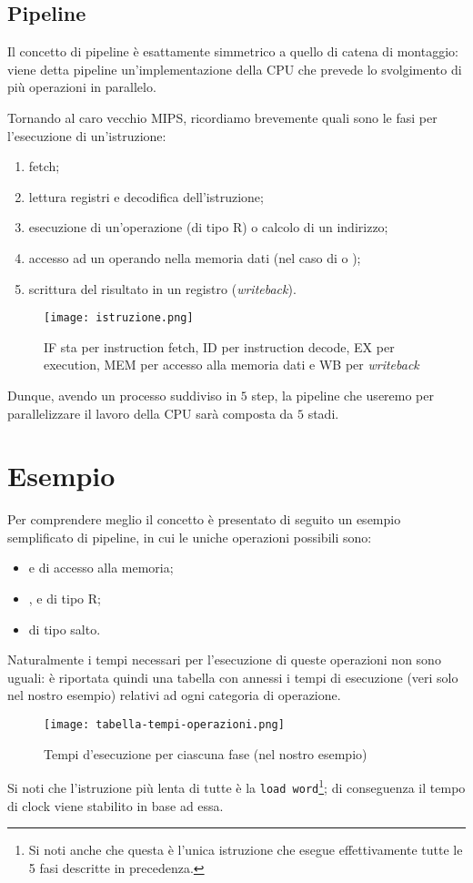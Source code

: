 \subsection*{Pipeline}
Il concetto di pipeline è esattamente simmetrico a quello di catena di montaggio: viene detta pipeline un'implementazione della CPU che prevede lo svolgimento di più operazioni in parallelo.

Tornando al caro vecchio MIPS, ricordiamo brevemente quali sono le fasi per l'esecuzione di un'istruzione:
\begin{enumerate}[noitemsep]
	\item fetch;
	\item lettura registri e decodifica dell'istruzione;
	\item esecuzione di un'operazione (di tipo R) o calcolo di un indirizzo;
	\item accesso ad un operando nella memoria dati (nel caso di  o );
	\item scrittura del risultato in un registro (\emph{writeback}).
\end{enumerate}
\begin{figure}[H]
	\centering
	\texttt{[image: istruzione.png]}
	\caption{IF sta per instruction fetch, ID per instruction decode, EX per execution, MEM per accesso alla memoria dati e WB per \emph{writeback}}
\end{figure}
Dunque, avendo un processo suddiviso in \(5\) step, la pipeline che useremo per parallelizzare il lavoro della CPU sarà composta da \(5\) stadi.

\section{Esempio}
Per comprendere meglio il concetto è presentato di seguito un esempio semplificato di pipeline, in cui le uniche operazioni possibili sono:
\begin{itemize}
	\item {} e  di accesso alla memoria;
	\item {},  e  di tipo R;
	\item {} di tipo salto.
\end{itemize}
Naturalmente i tempi necessari per l'esecuzione di queste operazioni non sono uguali: è riportata quindi una tabella con annessi i tempi di esecuzione (veri solo nel nostro esempio) relativi ad ogni categoria di operazione.
\begin{figure}[H]
	\centering
	\texttt{[image: tabella-tempi-operazioni.png]}
	\caption{Tempi d'esecuzione per ciascuna fase (nel nostro esempio)}
\end{figure}
Si noti che l'istruzione più lenta di tutte è la \texttt{load word}\footnote{Si noti anche che questa è l'unica istruzione che esegue effettivamente tutte le 5 fasi descritte in precedenza.}; di conseguenza il tempo di clock viene stabilito in base ad essa.

